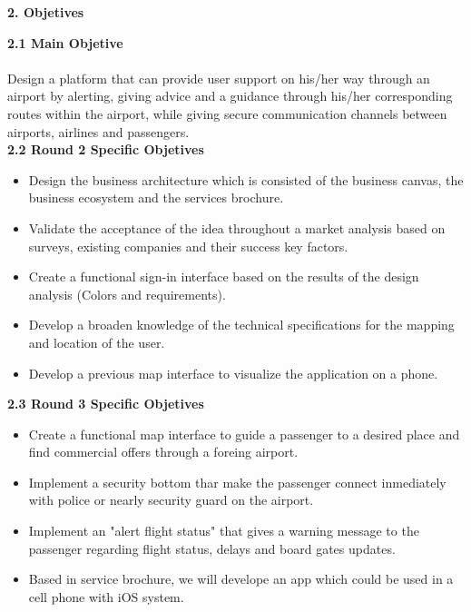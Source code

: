 \documentclass[]{article}
\begin{document}
\Large{\textbf{2. Objetives}\\}

\Large{\textbf{2.1 Main Objetive}\\}\\
[0.1cm]

Design a platform that can provide user support on his/her way through an airport by alerting, giving advice and a guidance through his/her corresponding routes within the airport, while giving secure communication channels between airports, airlines and passengers.\\
[0.7cm]

\Large{\textbf{2.2 Round 2 Specific Objetives}\\}
\begin{itemize}
	\item Design the business architecture which is consisted of the business canvas, the business ecosystem and the services brochure.
	\item Validate the acceptance of the idea throughout a market analysis based on surveys, existing companies and their success key factors.
	\item Create a functional sign-in interface based on the results of the design analysis (Colors and requirements). 
	\item Develop a broaden knowledge of the technical specifications for the mapping and location of the user.
	\item Develop a previous map interface to visualize the application on a phone.\\
[0.7cm]
\end{itemize}

\Large{\textbf{2.3 Round 3 Specific Objetives}\\}
\begin{itemize}
	\item Create a functional map interface to guide a passenger to a desired place and find commercial offers through a foreing airport.
	\item Implement a security bottom thar make the passenger connect inmediately with police or nearly security guard on the airport.
	\item Implement an "alert flight status" that gives a warning message to the passenger regarding flight status, delays and board gates updates. 
	\item Based in service brochure, we will develope an app which could be used in a cell phone with iOS system.\\
[0.7cm]
\end{itemize}
\end{document}

